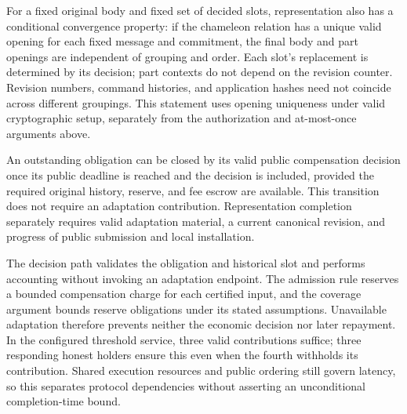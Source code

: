 For a fixed original body and fixed set of decided slots, representation
also has a conditional convergence property: if the chameleon relation has
a unique valid opening for each fixed message and commitment, the final
body and part openings are independent of grouping and order. Each slot's
replacement is determined by its decision; part contexts do not depend on
the revision counter. Revision numbers, command histories, and application
hashes need not coincide across different groupings. This statement uses
opening uniqueness under valid cryptographic setup, separately from the
authorization and at-most-once arguments above.

\begin{proposition}
\label{prop:c3-closure}
An outstanding obligation can be closed by its valid public compensation
decision once its public deadline is reached and the decision is included,
provided the required original history, reserve, and fee escrow are
available. This transition does not require an adaptation contribution.
Representation completion separately requires valid adaptation material,
a current canonical revision, and progress of public submission and local
installation.
\end{proposition}
\begin{IEEEproof}
The decision path validates the obligation and historical slot and performs
accounting without invoking an adaptation endpoint. The admission rule
reserves a bounded compensation charge for each certified input, and the
coverage argument bounds reserve obligations under its stated assumptions.
Unavailable adaptation therefore prevents neither the economic decision
nor later repayment. In the configured threshold service, three valid
contributions suffice; three responding honest holders ensure this even
when the fourth withholds its contribution. Shared execution resources and
public ordering still govern latency, so this separates protocol
dependencies without asserting an unconditional completion-time bound.
\end{IEEEproof}
